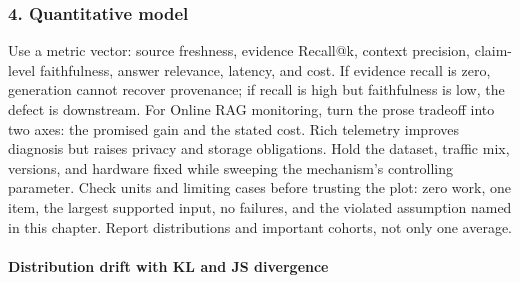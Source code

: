 \subsubsection*{4. Quantitative model}
Use a metric vector: source freshness, evidence Recall@k, context precision, claim-level faithfulness, answer relevance, latency, and cost. If evidence recall is zero, generation cannot recover provenance; if recall is high but faithfulness is low, the defect is downstream.
For Online RAG monitoring, turn the prose tradeoff into two axes: the promised gain and the stated cost. Rich telemetry improves diagnosis but raises privacy and storage obligations. Hold the dataset, traffic mix, versions, and hardware fixed while sweeping the mechanism's controlling parameter.
Check units and limiting cases before trusting the plot: zero work, one item, the largest supported input, no failures, and the violated assumption named in this chapter. Report distributions and important cohorts, not only one average.
\paragraph{Distribution drift with KL and JS divergence}
